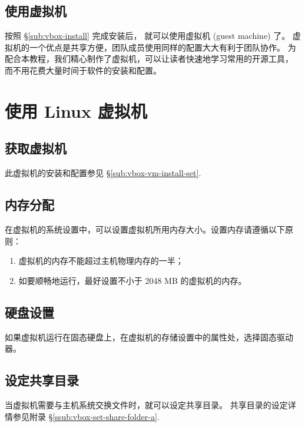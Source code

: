 \documentclass[
    11pt,
    base=hide,
    cite=authoryear,
    device=phone,
    lang=cn,
    mode=simple,
    result=answer,
    toc=onecol,
]{elegantbook_sierxue}
\begin{document}
\subsection{使用虚拟机}%
\label{sub:vbox-vm}

按照 \S\ref{sub:vbox-install} 完成安装后，
就可以使用虚拟机 (guest machine) 了。
虚拟机的一个优点是共享方便，团队成员使用同样的配置大大有利于团队协作。
为配合本教程，我们精心制作了虚拟机，可以让读者快速地学习常用的开源工具，
而不用花费大量时间于软件的安装和配置。

\newpage
\section{使用 Linux 虚拟机}%
\label{sec:linux}

\subsection{获取虚拟机}%
\label{ssub:vm-download}

此虚拟机的安装和配置参见 \S\ref{sub:vbox-vm-install-set}.

\subsection{内存分配}%
\label{ssub:vbox-set-memory}

在虚拟机的系统设置中，可以设置虚拟机所用内存大小。设置内存请遵循以下原则：
\begin{enumerate}
    \item 虚拟机的内存不能超过主机物理内存的一半；
    \item 如要顺畅地运行，最好设置不小于 2048 MB 的虚拟机的内存。
\end{enumerate}

\subsection{硬盘设置}%
\label{ssub:vbox-set-vdi}

如果虚拟机运行在固态硬盘上，在虚拟机的存储设置中的属性处，选择固态驱动器。

\subsection{设定共享目录}%
\label{ssub:vbox-set-share-folder}

当虚拟机需要与主机系统交换文件时，就可以设定共享目录。
共享目录的设定详情参见附录 \S\ref{ssub:vbox-set-share-folder-a}.
\end{document}

